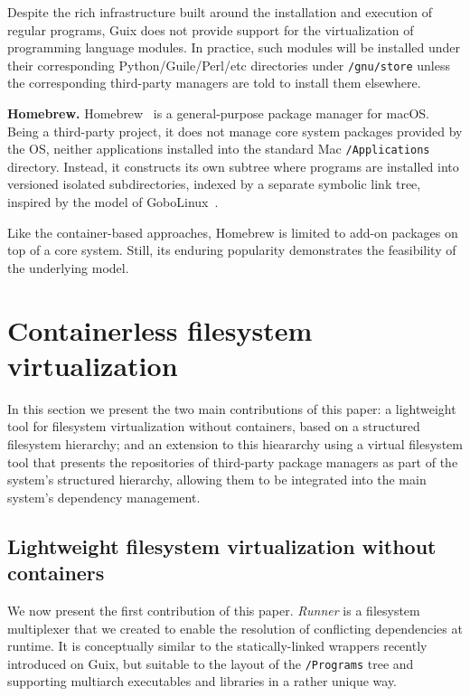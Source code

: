\documentclass[sigplan, anonymous, 10pt]{acmart}
\begin{document}
Despite the rich infrastructure built around the installation and execution of regular programs,
Guix does not provide support for the virtualization of programming language modules. In practice,
such modules will be installed under their corresponding Python/Guile/Perl/etc directories
under \texttt{/gnu/store} unless the corresponding third-party managers are told to install them
elsewhere.

\textbf{Homebrew.}
Homebrew~\cite{homebrew} is a general-purpose package manager for macOS. Being a third-party project,
it does not manage core system packages provided by the OS, neither applications installed
into the standard Mac \texttt{/Applications} directory. Instead, it constructs its own
subtree where programs are installed into versioned isolated subdirectories, indexed
by a separate symbolic link tree, inspired by the model of
GoboLinux~\cite{howell2009:homebrewgobo}.

Like the container-based approaches, Homebrew is limited to add-on packages on top of
a core system. Still, its enduring popularity demonstrates the feasibility of the
underlying model.

\section{Containerless filesystem virtualization}\label{sec:our_work}

In this section we present the two main contributions of this paper: a lightweight
tool for filesystem virtualization without containers, based on a structured
filesystem hierarchy; and an extension to this hieararchy using a virtual
filesystem tool that presents the repositories of third-party package managers
as part of the system's structured hierarchy, allowing them to be integrated
into the main system's dependency management.

\subsection{Lightweight filesystem virtualization without containers}
We now present the first contribution of this paper. \textit{Runner} is a
filesystem multiplexer that we created to enable the resolution of conflicting
dependencies at runtime. It is conceptually similar to the statically-linked
wrappers recently introduced on Guix, but suitable to the layout of the
\texttt{/Programs} tree and supporting multiarch executables and libraries
in a rather unique way.
\end{document}
